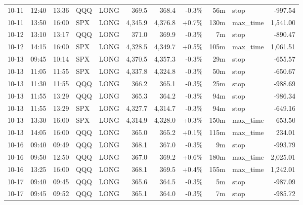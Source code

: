 \documentclass[11pt,a4paper,twoside]{article}
\begin{document}
\begin{center}
\begin{longtable}{>{\color{txtmain}}l l l l l r r r r >{\color{txtmain}}l r}
10-11 & 12:40 & 13:36 & QQQ & LONG & 369.5 & 368.4 & \textcolor{lossred}{-0.3\%} & 56m & stop & \textcolor{lossred}{-997.54} \\
10-11 & 13:50 & 16:00 & SPX & LONG & 4,345.9 & 4,376.8 & \textcolor{wingreen}{+0.7\%} & 130m & max\_time & \textcolor{wingreen}{1,541.00} \\
10-12 & 13:10 & 13:17 & QQQ & LONG & 371.0 & 369.9 & \textcolor{lossred}{-0.3\%} & 7m & stop & \textcolor{lossred}{-890.47} \\
10-12 & 14:15 & 16:00 & SPX & LONG & 4,328.5 & 4,349.7 & \textcolor{wingreen}{+0.5\%} & 105m & max\_time & \textcolor{wingreen}{1,061.51} \\
10-13 & 09:45 & 10:14 & SPX & LONG & 4,370.5 & 4,357.3 & \textcolor{lossred}{-0.3\%} & 29m & stop & \textcolor{lossred}{-655.57} \\
10-13 & 11:05 & 11:55 & SPX & LONG & 4,337.8 & 4,324.8 & \textcolor{lossred}{-0.3\%} & 50m & stop & \textcolor{lossred}{-650.67} \\
10-13 & 11:30 & 11:55 & QQQ & LONG & 366.2 & 365.1 & \textcolor{lossred}{-0.3\%} & 25m & stop & \textcolor{lossred}{-988.69} \\
10-13 & 11:55 & 13:29 & QQQ & LONG & 365.3 & 364.2 & \textcolor{lossred}{-0.3\%} & 94m & stop & \textcolor{lossred}{-986.34} \\
10-13 & 11:55 & 13:29 & SPX & LONG & 4,327.7 & 4,314.7 & \textcolor{lossred}{-0.3\%} & 94m & stop & \textcolor{lossred}{-649.16} \\
10-13 & 13:30 & 16:00 & SPX & LONG & 4,314.9 & 4,328.0 & \textcolor{wingreen}{+0.3\%} & 150m & max\_time & \textcolor{wingreen}{653.50} \\
10-13 & 14:05 & 16:00 & QQQ & LONG & 365.0 & 365.2 & \textcolor{wingreen}{+0.1\%} & 115m & max\_time & \textcolor{wingreen}{234.01} \\
10-16 & 09:40 & 09:49 & QQQ & LONG & 368.1 & 367.0 & \textcolor{lossred}{-0.3\%} & 9m & stop & \textcolor{lossred}{-993.79} \\
10-16 & 09:50 & 12:50 & QQQ & LONG & 367.0 & 369.2 & \textcolor{wingreen}{+0.6\%} & 180m & max\_time & \textcolor{wingreen}{2,025.01} \\
10-16 & 13:25 & 16:00 & QQQ & LONG & 368.1 & 369.5 & \textcolor{wingreen}{+0.4\%} & 155m & max\_time & \textcolor{wingreen}{1,242.01} \\
10-17 & 09:40 & 09:45 & QQQ & LONG & 365.6 & 364.5 & \textcolor{lossred}{-0.3\%} & 5m & stop & \textcolor{lossred}{-987.09} \\
10-17 & 09:45 & 09:52 & QQQ & LONG & 365.1 & 364.0 & \textcolor{lossred}{-0.3\%} & 7m & stop & \textcolor{lossred}{-985.72} \\

\end{longtable}
\end{center}
\end{document}
